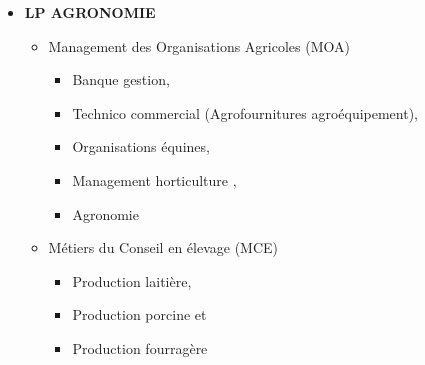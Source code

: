 \documentclass[11pt]{article}
\begin{document}
\begin{itemize}
\item \textbf{LP AGRONOMIE}
\begin{itemize}
\item Management des Organisations Agricoles (MOA)
\begin{itemize}
\item Banque gestion,
\item Technico commercial (Agrofournitures agroéquipement),
\item Organisations équines,
\item Management horticulture  ,
\item Agronomie
\end{itemize}
\item Métiers du Conseil en élevage (MCE)
\begin{itemize}
\item Production laitière,
\item Production porcine et
\item Production fourragère
\end{itemize}
\end{itemize}
\end{itemize}

\newpage
\end{document}
